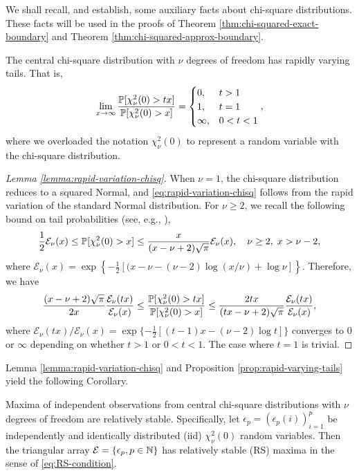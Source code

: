 We shall recall, and establish, some auxiliary facts about chi-square distributions. 
These facts will be used in the proofs of Theorem \ref{thm:chi-squared-exact-boundary} and Theorem \ref{thm:chi-squared-approx-boundary}.

\begin{lemma} \label{lemma:rapid-variation-chisq}
The central chi-square distribution with $\nu$ degrees of freedom has rapidly varying tails.
That is, 
\begin{equation} \label{eq:rapid-variation-chisq}
    \lim_{x\to\infty}\frac{\P[\chi_\nu^2(0)>tx]}{\P[\chi_\nu^2(0)>x]} = 
    \begin{cases}
    0, & t > 1 \\
    1, & t = 1 \\
    \infty, & 0 < t < 1
\end{cases},
\end{equation}
where we overloaded the notation $\chi_\nu^2(0)$ to represent a random variable with the chi-square distribution.
\end{lemma}

\begin{proof}[Lemma \ref{lemma:rapid-variation-chisq}]
When $\nu=1$, the chi-square distribution reduces to a squared Normal, and \eqref{eq:rapid-variation-chisq} follows from the rapid variation of the standard Normal distribution.
For $\nu\ge2$, we recall the following bound on tail probabilities (see, e.g., \citep{inglot2010inequalities}),
$$
\frac{1}{2}\mathcal{E}_\nu(x) \le \P[\chi_\nu^2(0)>x] \le \frac{x}{(x-\nu+2)\sqrt{\pi}} \mathcal{E}_\nu(x), \quad \nu\ge2,\;x>\nu-2,
$$
where $\mathcal{E}_\nu(x) = \exp\left\{-\frac{1}{2}[(x-\nu-(\nu-2)\log(x/\nu) + \log\nu]\right\}$.
Therefore, we have 
$$
\frac{(x-\nu+2)\sqrt{\pi}}{2x}\frac{\mathcal{E}_\nu(tx)}{\mathcal{E}_\nu(x)} 
\le \frac{\P[\chi_\nu^2(0)>tx]}{\P[\chi_\nu^2(0)>x]}
\le \frac{2tx}{(tx-\nu+2)\sqrt{\pi}}\frac{\mathcal{E}_\nu(tx)}{\mathcal{E}_\nu(x)},
$$
where ${\mathcal{E}_\nu(tx)}/{\mathcal{E}_\nu(x)} = \exp\{-\frac{1}{2}[(t-1)x-(\nu-2)\log{t}]\}$ converges to $0$ or $\infty$ depending on whether $t>1$ or $0<t<1$.
The case where $t=1$ is trivial.
\end{proof}

Lemma \ref{lemma:rapid-variation-chisq} and Proposition \ref{prop:rapid-varying-tails} yield the following Corollary.

\begin{corollary} \label{cor:relative-stability}
Maxima of independent observations from central chi-square distributions with $\nu$ degrees of freedom are relatively stable. 
Specifically, let $\epsilon_p = \left(\epsilon_p(i)\right)_{i=1}^p$ be independently and identically distributed (iid) $\chi_\nu^2(0)$ random variables. 
Then the triangular array ${\cal E} = \{\epsilon_p, p\in\N\}$ has relatively stable (RS) maxima in the sense of \eqref{eq:RS-condition}.
\end{corollary}


